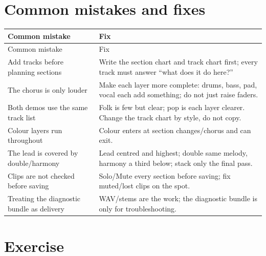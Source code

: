 

\section{Common mistakes and fixes}
\label{sec:walkthrough-mistakes}

\begin{longtable}{p{}p{}}
\toprule
Common mistake & Fix \\
\midrule
\endfirsthead
\toprule
Common mistake & Fix \\
\midrule
\endhead
Add tracks before planning sections & Write the section chart and track chart first; every track must answer ``what does it do here?'' \\
The chorus is only louder & Make each layer more complete: drums, bass, pad, vocal each add something; do not just raise faders. \\
Both demos use the same track list & Folk is few but clear; pop is each layer clearer. Change the track chart by style, do not copy. \\
Colour layers run throughout & Colour enters at section changes/chorus and can exit. \\
The lead is covered by double/harmony & Lead centred and highest; double same melody, harmony a third below; stack only the final pass. \\
Clips are not checked before saving & Solo/Mute every section before saving; fix muted/lost clips on the spot. \\
Treating the diagnostic bundle as delivery & WAV/stems are the work; the diagnostic bundle is only for troubleshooting. \\
\bottomrule
\end{longtable}

\section{Exercise}
\label{sec:walkthrough-exercise}


